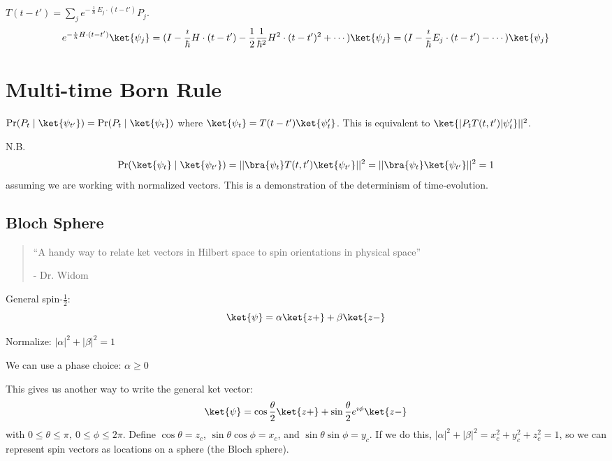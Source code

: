 \documentclass[a4paper,twoside,master.tex]{subfiles}
\begin{document}
$T(t-t') = \sum_j e^{-\frac{\imath}{\hbar}E_j\cdot(t-t')}P_j$.
\begin{equation}
e^{-\frac{\imath}{\hbar}H\cdot(t-t')}\ket{\psi_j} = (I-\frac{\imath}{\hbar}H\cdot(t-t')-\frac{1}{2}\frac{1}{\hbar^2}H^2\cdot(t-t')^2+\cdots)\ket{\psi_j} = (I-\frac{\imath}{\hbar}E_j\cdot(t-t') - \cdots)\ket{\psi_j}
\end{equation}

\section{Multi-time Born Rule}
\label{sec:multi-time_born_rule}


$\Pr(P_t\mid \ket{\psi_{t'}}) = \Pr(P_t\mid \ket{\psi_t})$ where
$\ket{\psi_t} = T(t-t')\ket{\psi_t'}$. This is equivalent to
$\ket{|P_tT(t,t')|\psi_t'}||^2$.

\begin{note}{N.B.}
\begin{equation}
\Pr(\ket{\psi_t}\mid \ket{\psi_{t'}}) = ||\bra{\psi_t}T(t,t')\ket{\psi_{t'}}||^2 = ||\bra{\psi_t}\ket{\psi_{t'}}||^2 = 1
\end{equation}
assuming we are working with normalized vectors. This is a demonstration
of the determinism of time-evolution.
\end{note}



\subsection{Bloch Sphere}
\label{sub:bloch_sphere}

\begin{quote}
``A handy way to relate ket vectors in Hilbert space to spin orientations
in physical space''

- Dr. Widom
\end{quote}

General spin-$\frac{1}{2}$:
\begin{equation}
\ket{\psi} = \alpha\ket{z+} + \beta\ket{z-}
\end{equation}

Normalize: $|\alpha|^2+|\beta|^2 = 1$

We can use a phase choice: $\alpha\geq 0$

This gives us another way to write the general ket vector:
\begin{equation}
\ket{\psi} = \cos\frac{\theta}{2}\ket{z+} + \sin\frac{\theta}{2}e^{\imath\phi}\ket{z-}
\end{equation}
with $0\leq\theta\leq\pi,\ 0\leq\phi\leq2\pi$. Define
$\cos\theta = z_c$, $\sin\theta\cos\phi = x_c$, and
$\sin\theta\sin\phi = y_c$. If we do this,
$|\alpha|^2+|\beta|^2 = x_c^2+y_c^2+z_c^2 = 1$, so we can represent
spin vectors as locations on a sphere (the Bloch sphere).
\end{document}
